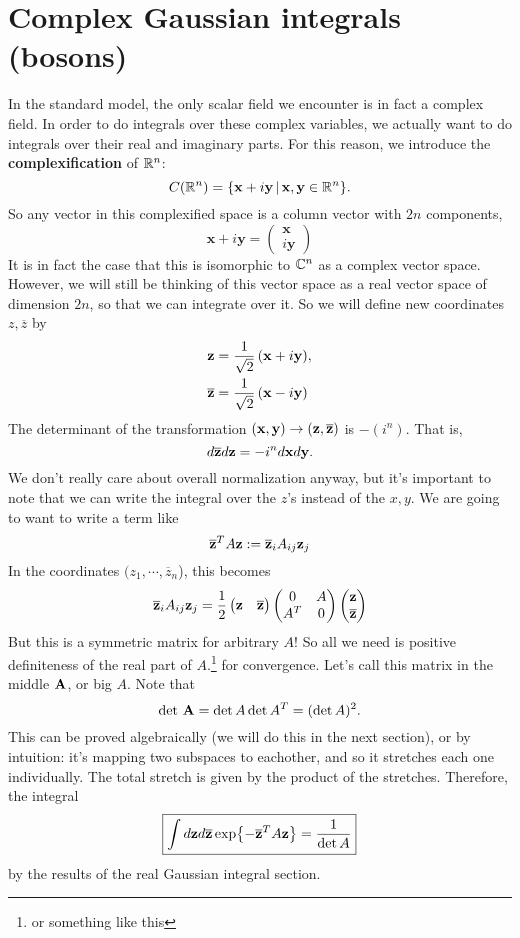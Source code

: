 \documentclass{book}
\begin{document}
\section{Complex Gaussian integrals (bosons)}
In the standard model, the only scalar field we encounter is in fact a complex field. In order to do integrals over these complex variables, we actually want to do integrals over their real and imaginary parts. For this reason, we introduce the \textbf{complexification} of $\mathbb{R}^n$:
\[
C(\mathbb{R}^n) = \{\mathbf{x} + i\mathbf{y} \, \vert \, \mathbf{x},\mathbf{y} \in \mathbb{R}^n \}.
\]
So any vector in this complexified space is a column vector with $2n$ components,
\[
\mathbf{x} + i\mathbf{y} = \begin{pmatrix}
\mathbf{x} \\
i\mathbf{y}
\end{pmatrix}
\]
It is in fact the case that this is isomorphic to $\mathbb{C}^n$ as a complex vector space. However, we will still be thinking of this vector space as a real vector space of dimension $2n$, so that we can integrate over it. So we will define new coordinates $z,\overline{z}$ by
\begin{align*}
\mathbf{z} = \frac{1}{\sqrt{2}} \left( \mathbf{x} + i\mathbf{y} \right) &, \\
\overline{\mathbf{z}} = \frac{1}{\sqrt{2}} \left(\mathbf{x} -i \mathbf{y} \right)&
\end{align*}
The determinant of the transformation $(\mathbf{x},\mathbf{y}) \to (\mathbf{z},\overline{\mathbf{z}})$ is $-(i^n)$. That is,
\[
d\overline{\mathbf{z}} d\mathbf{z} = - i^n d\mathbf{x} d\mathbf{y}.
\]
We don't really care about overall normalization anyway, but it's important to note that we can write the integral over the $z$'s instead of the $x,y$.
We are going to want to write a term like
\[
\overline{\mathbf{z}}^T A \mathbf{z} := \overline{\mathbf{z}}_i A_{ij} \mathbf{z}_j
\]
In the coordinates $(z_1,\cdots,\overline{z}_n$), this becomes
\[
\overline{\mathbf{z}}_i A_{ij} \mathbf{z}_j = \frac{1}{2}
\begin{pmatrix} 
\mathbf{z} & \overline{\mathbf{z}}
\end{pmatrix}
\begin{pmatrix}
0 & A \\
A^T & 0
\end{pmatrix}
\begin{pmatrix}
\mathbf{z}\\ 
\overline{\mathbf{z}}
\end{pmatrix}
\]
But this is a symmetric matrix for arbitrary $A$! So all we need is positive definiteness of the real part of $A$.\footnote{or something like this} for convergence. Let's call this matrix in the middle $\mathbf{A}$, or big $A$. Note that 
\[
\det \, \mathbf{A} = \det A \det A^T = (\det A)^2.
\]
This can be proved algebraically (we will do this in the next section), or by intuition: it's mapping two subspaces to eachother, and so it stretches each one individually. The total stretch is given by the product of the stretches. Therefore, the integral
\begin{equation} \label{eq:bosongauss}
\boxed{\int d\mathbf{z} d\overline{\mathbf{z}} \exp{-\overline{\mathbf{z}}^T A \mathbf{z}} = \frac{1}{\det A}}
\end{equation}
by the results of the real Gaussian integral section.
\end{document}
